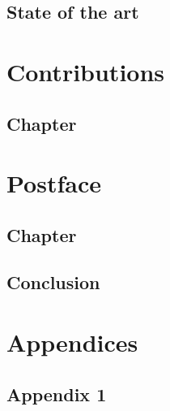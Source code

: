 \documentclass{style/umemoir}
\begin{document}

\chapter{State of the art}
\label{chapter:state_of_the_art}
%


\part{Contributions}
\label{part:contribution}


\label{chapter:chapter}
\chapter{Chapter}



\part{Postface}
\label{part:postface}


\chapter{Chapter}
\label{chapter:chapter}
%


\chapter{Conclusion}
\label{chapter:conclusion}



\part{Appendices}
\label{part:appendices}

\begin{appendices}

\chapter{Appendix 1}

\end{appendices}
\end{document}
